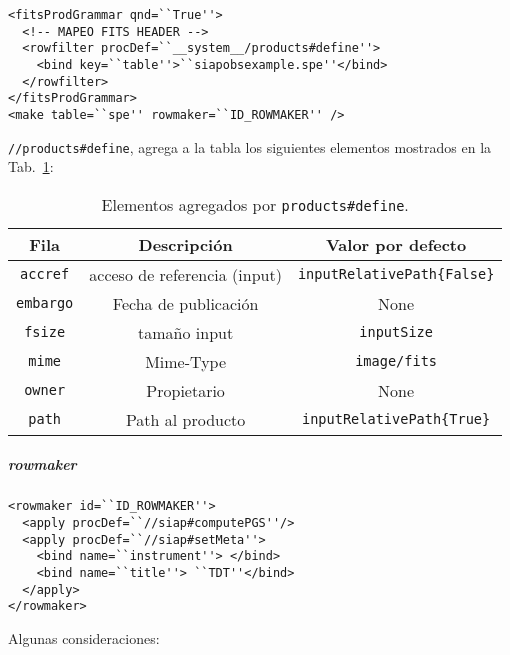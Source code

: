 \begin{verbatim}
<fitsProdGrammar qnd=``True''>
  <!-- MAPEO FITS HEADER -->
  <rowfilter procDef=``__system__/products#define''>
    <bind key=``table''>``siapobsexample.spe''</bind>
  </rowfilter>
</fitsProdGrammar>
<make table=``spe'' rowmaker=``ID_ROWMAKER'' />
\end{verbatim}

\verb;//products#define;, agrega a la tabla los siguientes elementos mostrados en la Tab.~\ref{tab:pd}:

\begin{table}[ht!]
	\begin{center}
		\begin{tabular}{c|c|c}
			Fila & Descripción & Valor por defecto \\\hline\hline
			\verb;accref;	& acceso de referencia (input)	& \verb;inputRelativePath{False}; \\\hline
			\verb;embargo;	& Fecha de publicación	        & None                            \\\hline
			\verb;fsize;	& tamaño input	                & \verb;inputSize;                \\\hline
			\verb;mime;	& Mime-Type	                & \verb;image/fits;               \\\hline
			\verb;owner;	& Propietario	                & None                            \\\hline
			\verb;path;	& Path al producto	        & \verb;inputRelativePath{True};  \\
		\end{tabular}
	\end{center}
	\caption{Elementos agregados por \texttt{products\#define}.}\label{tab:pd}
\end{table}

\subparagraph{rowmaker}

\begin{verbatim}
<rowmaker id=``ID_ROWMAKER''>
  <apply procDef=``//siap#computePGS''/>
  <apply procDef=``//siap#setMeta''>
    <bind name=``instrument''> </bind>
    <bind name=``title''> ``TDT''</bind>
  </apply>
</rowmaker>
\end{verbatim}

Algunas consideraciones:

